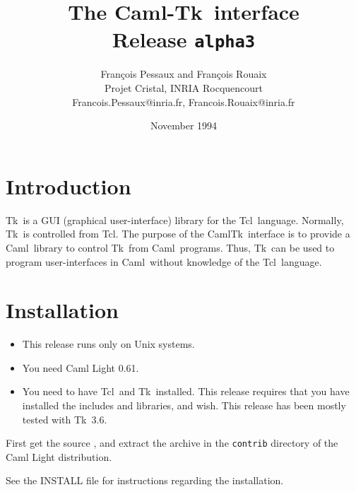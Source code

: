 
\newcommand{\tcl}{{\sf Tcl}}
\newcommand{\tk}{{\sf Tk}}
\newcommand{\caml}{{\sf Caml}}
\newcommand{\camltk}{{\sf CamlTk}}
\newcommand{\wish}{{\sf wish}}
\newcommand{\thisrelease}{{\tt alpha3}}
\title{The \caml-\tk\ interface \\
       Release \thisrelease}
\author{Fran\c{c}ois Pessaux and Fran\c{c}ois Rouaix \\
           Projet Cristal, INRIA Rocquencourt \\
        {\small Francois.Pessaux@inria.fr, Francois.Rouaix@inria.fr}
        }
\date{November 1994}

\maketitle


\section*{Introduction}
\tk\ is a GUI (graphical user-interface) library for the \tcl\ language.
Normally, \tk\ is controlled from \tcl. The purpose of the \camltk\
interface is to provide a \caml\ library to control \tk\ from \caml\
programs. Thus, \tk\ can be used to program user-interfaces in \caml\
without knowledge of the \tcl\ language.

\section*{Installation}

\begin{itemize}
\item This release runs only on Unix systems.
\item You need Caml Light 0.61.
\item You need to have \tcl\ and \tk\ installed. This release requires that
you have installed the includes and libraries, and \wish.
This release has been mostly tested with \tk\ 3.6.
\end{itemize} 

\begin{htmlonly}
First get the source
,
and extract the archive in the {\tt contrib} directory of the Caml Light
distribution. 
\end{htmlonly}

See the INSTALL file for instructions regarding the installation.


